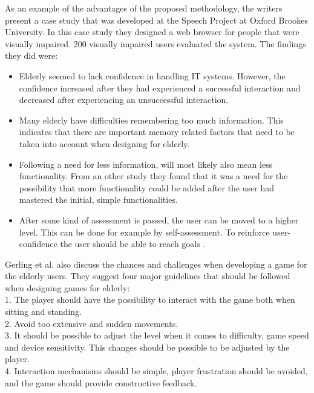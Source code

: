 As an example of the advantages of the proposed methodology, the writers present a case study that was developed at the Speech Project at Oxford Brookes University. In this case study they designed a web browser for people that were visually impaired. 200 visually impaired users evaluated the system.  The findings they did were: 
\begin{itemize}
\item Elderly seemed to lack confidence in handling IT systems. However, the confidence increased after they had experienced a successful interaction and decreased after experiencing an unsuccessful interaction.
\item Many elderly have difficulties remembering too much information. This indicates that there are important memory related factors that need to be taken into account when designing for elderly. 
\item Following a need for less information, will most likely also mean less functionality. From an other study they found that it was a need for the possibility that more functionality could be added after the user had mastered the initial, simple functionalities.
\item After some kind of assessment is passed, the user can be moved to a higher level. This can be done for example by self-assessment. To reinforce user-confidence the user should be able to reach goals \cite{gregor}. 
\end{itemize}

Gerling et al. \cite{gerling1} also discuss the chances and challenges when developing a game for the elderly users. They suggest four major guidelines that should be followed when designing games for elderly: \\
1. The player should have the possibility to interact with the game both when sitting and standing. \\
2. Avoid too extensive and sudden movements.\\
3. It should be possible to adjust the level when it comes to difficulty, game speed and device sensitivity. This changes should be possible to be adjusted by the player. \\
4. Interaction mechanisms should be simple, player frustration should be avoided, and the game should provide constructive feedback.

